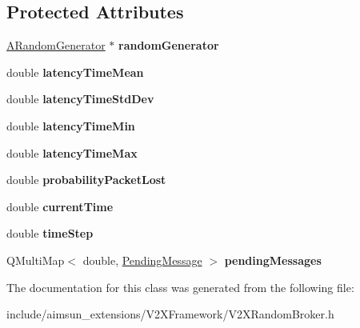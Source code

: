 \subsection*{Protected Attributes}
\begin{DoxyCompactItemize}
\item 
\hyperlink{classARandomGenerator}{A\+Random\+Generator} $\ast$ {\bfseries random\+Generator}\hypertarget{classV2XRandomBroker_a2fb9da75f0387b18150f80c178eda62d}{}\label{classV2XRandomBroker_a2fb9da75f0387b18150f80c178eda62d}

\item 
double {\bfseries latency\+Time\+Mean}\hypertarget{classV2XRandomBroker_ae1240efd3aa2bdc480d6dcd4392820d4}{}\label{classV2XRandomBroker_ae1240efd3aa2bdc480d6dcd4392820d4}

\item 
double {\bfseries latency\+Time\+Std\+Dev}\hypertarget{classV2XRandomBroker_a4f564bb41660bee61ced001345e2110e}{}\label{classV2XRandomBroker_a4f564bb41660bee61ced001345e2110e}

\item 
double {\bfseries latency\+Time\+Min}\hypertarget{classV2XRandomBroker_a4b946401082e8140ff01c303461bfd8b}{}\label{classV2XRandomBroker_a4b946401082e8140ff01c303461bfd8b}

\item 
double {\bfseries latency\+Time\+Max}\hypertarget{classV2XRandomBroker_a49df6391057d25c18a7c143311ab9157}{}\label{classV2XRandomBroker_a49df6391057d25c18a7c143311ab9157}

\item 
double {\bfseries probability\+Packet\+Lost}\hypertarget{classV2XRandomBroker_a71e6aca1e0df97602f689f4dcd2bdc14}{}\label{classV2XRandomBroker_a71e6aca1e0df97602f689f4dcd2bdc14}

\item 
double {\bfseries current\+Time}\hypertarget{classV2XRandomBroker_ab54ea871c443623a6625c5fa6492db49}{}\label{classV2XRandomBroker_ab54ea871c443623a6625c5fa6492db49}

\item 
double {\bfseries time\+Step}\hypertarget{classV2XRandomBroker_a855c2038505b619f83b950ee32b8e265}{}\label{classV2XRandomBroker_a855c2038505b619f83b950ee32b8e265}

\item 
Q\+Multi\+Map$<$ double, \hyperlink{classV2XRandomBroker_1_1PendingMessage}{Pending\+Message} $>$ {\bfseries pending\+Messages}\hypertarget{classV2XRandomBroker_a5c10c2ff6ab62387f3de79f2ae83036c}{}\label{classV2XRandomBroker_a5c10c2ff6ab62387f3de79f2ae83036c}

\end{DoxyCompactItemize}


The documentation for this class was generated from the following file\+:\begin{DoxyCompactItemize}
\item 
include/aimsun\+\_\+extensions/\+V2\+X\+Framework/V2\+X\+Random\+Broker.\+h\end{DoxyCompactItemize}
